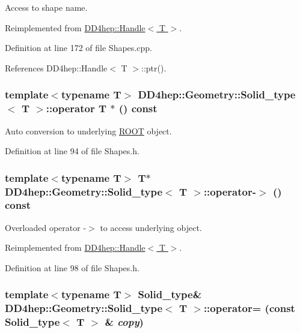 Access to shape name. 

Reimplemented from \hyperlink{class_d_d4hep_1_1_handle_a9c62b8d37e0f2354bae0093498dc15a1}{DD4hep::Handle$<$ T $>$}.

Definition at line 172 of file Shapes.cpp.

References DD4hep::Handle$<$ T $>$::ptr().\hypertarget{class_d_d4hep_1_1_geometry_1_1_solid__type_a3b4a11b9fc161638f8d386e2a8c6a0fd}{
\subsubsection[{operator T $\ast$}]{\setlength{\rightskip}{0pt plus 5cm}template$<$typename T$>$ {\bf DD4hep::Geometry::Solid\_\-type}$<$ {\bf T} $>$::operator {\bf T} $\ast$ () const}}
\label{class_d_d4hep_1_1_geometry_1_1_solid__type_a3b4a11b9fc161638f8d386e2a8c6a0fd}


Auto conversion to underlying \hyperlink{namespace_r_o_o_t}{ROOT} object. 

Definition at line 94 of file Shapes.h.\hypertarget{class_d_d4hep_1_1_geometry_1_1_solid__type_a5d2e4f5e2567ddb3c60bf78a25f5e0b4}{
\subsubsection[{operator-\/$>$}]{\setlength{\rightskip}{0pt plus 5cm}template$<$typename T$>$ {\bf T}$\ast$ {\bf DD4hep::Geometry::Solid\_\-type}$<$ {\bf T} $>$::operator-\/$>$ () const}}
\label{class_d_d4hep_1_1_geometry_1_1_solid__type_a5d2e4f5e2567ddb3c60bf78a25f5e0b4}


Overloaded operator -\/$>$ to access underlying object. 

Reimplemented from \hyperlink{class_d_d4hep_1_1_handle_afb3984a2a89e50232d519c535818d74b}{DD4hep::Handle$<$ T $>$}.

Definition at line 98 of file Shapes.h.\hypertarget{class_d_d4hep_1_1_geometry_1_1_solid__type_a39edebfe864cbb84ed34759519f0cb5a}{
\subsubsection[{operator=}]{\setlength{\rightskip}{0pt plus 5cm}template$<$typename T$>$ {\bf Solid\_\-type}\& {\bf DD4hep::Geometry::Solid\_\-type}$<$ {\bf T} $>$::operator= (const {\bf Solid\_\-type}$<$ {\bf T} $>$ \& {\em copy})}}
\label{class_d_d4hep_1_1_geometry_1_1_solid__type_a39edebfe864cbb84ed34759519f0cb5a}


